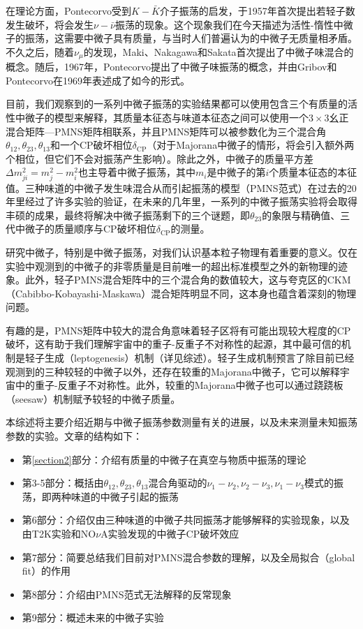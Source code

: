 \documentclass{article}
\begin{document}
	在理论方面，Pontecorvo受到$K-\bar{K}$介子振荡的启发，于1957年首次提出若轻子数发生破坏，将会发生$\nu-\bar{\nu}$振荡的现象\cite{Pontecorvo1957}\cite{Pontecorvo1958b}。这个现象我们在今天描述为活性-惰性中微子的振荡，这需要中微子具有质量，与当时人们普遍认为的中微子无质量相矛盾。不久之后，随着$\nu_\mu$的发现，Maki、Nakagawa和Sakata首次提出了中微子味混合的概念\cite{Maki1962}。随后，1967年，Pontecorvo提出了中微子味振荡的概念\cite{Pontecorvo1967}，并由Gribov和Pontecorvo在1969年表述成了如今的形式\cite{Gribov1969}。
	
	目前，我们观察到的一系列中微子振荡的实验结果都可以使用包含三个有质量的活性中微子的模型来解释，其质量本征态与味道本征态之间可以使用一个$3\times3$幺正混合矩阵—PMNS矩阵相联系，并且PMNS矩阵可以被参数化为三个混合角$\theta_{12},\theta_{23},\theta_{13}$和一个CP破坏相位$\delta_\mathrm{CP}$（对于Majorana中微子的情形，将会引入额外两个相位，但它们不会对振荡产生影响）。除此之外，中微子的质量平方差$\Delta m_{ji}^2=m_j^2-m_i^2$也主导着中微子振荡，其中$m_i$是中微子的第$i$个质量本征态的本征值。三种味道的中微子发生味混合从而引起振荡的模型（PMNS范式）在过去的20年里经过了许多实验的验证，在未来的几年里，一系列的中微子振荡实验将会取得丰硕的成果，最终将解决中微子振荡剩下的三个谜题，即$\theta_{23}$的象限与精确值、三代中微子的质量顺序与CP破坏相位$\delta_\mathrm{CP}$的测量。
	
	研究中微子，特别是中微子振荡，对我们认识基本粒子物理有着重要的意义。仅在实验中观测到的中微子的非零质量是目前唯一的超出标准模型之外的新物理的迹象\cite{Mohapatra2007}。此外，轻子PMNS混合矩阵中的三个混合角的数值较大，这与夸克区的CKM（Cabibbo-Kobayashi-Maskawa）混合矩阵\cite{Cabibbo1963}\cite{Kobayashi1973}明显不同，这本身也蕴含着深刻的物理问题。
	
	有趣的是，PMNS矩阵中较大的混合角意味着轻子区将有可能出现较大程度的CP破坏，这有助于我们理解宇宙中的重子-反重子不对称性的起源，其中最可信的机制是轻子生成（leptogenesis）机制\cite{Fukugita1986}（详见综述\cite{Davidson2008}）。轻子生成机制预言了除目前已经观测到的三种较轻的中微子以外，还存在较重的Majorana中微子，它可以解释宇宙中的重子-反重子不对称性。此外，较重的Majorana中微子也可以通过跷跷板（seesaw）机制赋予较轻的中微子质量\cite{Minkowski1977}\cite{GellMann1979}\cite{Yanagida1979}\cite{Glashow1980}\cite{Mohapatra1980}。
	
	本综述将主要介绍近期与中微子振荡参数测量有关的进展，以及未来测量未知振荡参数的实验。文章的结构如下：
	\begin{itemize}
		\item 第\ref{section2}部分：介绍有质量的中微子在真空与物质中振荡的理论
		\item 第3-5部分：概括由$\theta_{12},\theta_{23},\theta_{13}$混合角驱动的$\nu_1-\nu_2,\nu_2-\nu_3,\nu_1-\nu_3$模式的振荡，即两种味道的中微子引起的振荡
		\item 第6部分：介绍仅由三种味道的中微子共同振荡才能够解释的实验现象，以及由T2K实验和NO$\nu$A实验发现的中微子CP破坏效应
		\item 第7部分：简要总结我们目前对PMNS混合参数的理解，以及全局拟合（global fit）的作用
		\item 第8部分：介绍由PMNS范式无法解释的反常现象
		\item 第9部分：概述未来的中微子实验
	\end{itemize}
	
\end{document}
